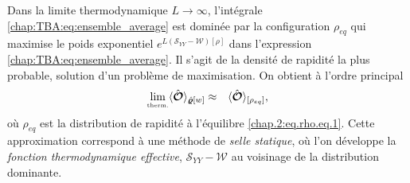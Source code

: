 Dans la limite thermodynamique \( L \to \infty \), l'intégrale \eqref{chap:TBA:eq:ensemble_average} est dominée par la configuration \( \rho_{eq} \) qui maximise le poids exponentiel $e^{L(\mathcal{S}_{YY}-\mathcal{W})[\rho]}$  dans l'expression \eqref{chap:TBA:eq:ensemble_average}. Il s’agit de la densité de rapidité la plus probable, solution d’un problème de maximisation. On obtient à l’ordre principal
\begin{eqnarray}
	\underset{\mbox{\tiny therm.}}{\lim} \langle \hat{\bm{\mathcal{O}}} \rangle_{\hat{\bm{\varrho}}[w]} & \approx &  \langle\hat{\bm{\mathcal{O}}}\rangle_{[\rho_{eq} ]},	
	\label{chap:TBA:eq:ensemble_average:approx}
\end{eqnarray}
où $\rho_{eq}$ est la distribution de rapidité à l'équilibre \eqref{chap.2:eq.rho.eq.1}.
Cette approximation correspond à une méthode de \textit{selle statique}, où l’on développe la \emph{fonction thermodynamique effective}, $\mathcal{S}_{YY}-\mathcal{W}$  au voisinage de la distribution dominante.

%


